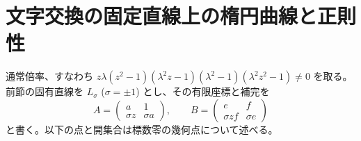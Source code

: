 \section{文字交換の固定直線上の楕円曲線と正則性}
\label{sec:fixed-line-elliptic}
通常倍率、すなわち
$z\lambda(z^2-1)(\lambda^2z-1)(\lambda^2-1)(\lambda^2z^2-1)\ne0$
を取る。前節の固有直線を $L_\sigma$ ($\sigma=\pm1$) とし、その有限座標と補完を
\[
 A=\begin{pmatrix}a&1\\\sigma z&\sigma a\end{pmatrix},
 \qquad B=\begin{pmatrix}e&f\\\sigma zf&\sigma e\end{pmatrix}
\]
と書く。以下の点と開集合は標数零の幾何点について述べる。


